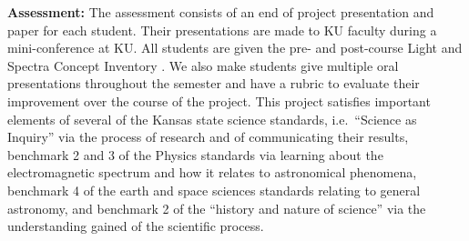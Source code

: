 \documentclass[11pt, preprint]{aastex}
\begin{document}
{\noindent
\textbf{Assessment:} %
The assessment consists of an end of project presentation and paper
for each student. Their presentations are made to KU faculty during a
mini-conference at KU. All students are given the pre- and post-course
Light and Spectra Concept Inventory \citep{bardar06}.  We also make
students give multiple oral presentations throughout the semester and
have a rubric to evaluate their improvement over the course of the
project.
This project satisfies important elements of several of the Kansas
state science standards, i.e.~``Science as Inquiry'' via the process
of research and of communicating their results, benchmark 2 and 3 of
the Physics standards via learning about the electromagnetic spectrum
and how it relates to astronomical phenomena, benchmark 4 of the earth
and space sciences standards relating to general astronomy, and
benchmark 2 of the ``history and nature of science'' via the
understanding gained of the scientific process.




\clearpage

%
%

%











}
\end{document}
